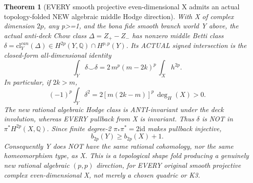 \documentclass[11pt]{article}
\newcommand{\Q}{\mathbb Q}
\newcommand{\cl}{\mathrm{cl}}
\newtheorem{theorem}{Theorem}
\begin{document}
\begin{theorem}[EVERY smooth projective even-dimensional X admits an actual topology-folded NEW algebraic middle Hodge direction]
With X of complex dimension \(2p\), any p>=1,
and the bona fide smooth branch world Y above,
the actual anti-deck Chow class
\(\Delta=Z_+-Z_-\) has nonzero middle Betti class
\(\delta=\cl_Y^{can}(\Delta)\in
 H^{2p}(Y,\Q)\cap H^{p,p}(Y)\).
Its ACTUAL signed intersection is the
closed-form all-dimensional identity
\[
 \boxed{
 \int_Y\delta\smile\delta
   =2\,m^p(m-2k)^p\,\int_Xh^{2p}.
 }                                                        \tag{7}
\]
In particular, if \(2k>m\),
\[
 \boxed{
 (-1)^p\int_Y\delta^2
   =2[m(2k-m)]^p\,\deg_H(X)>0.
 }                                                        \tag{8}
\]
The new rational algebraic Hodge class is
ANTI-invariant under the deck involution,
whereas EVERY pullback from X is invariant.
Thus \(\delta\) is NOT in \(\pi^*H^{2p}(X,\Q)\).
Since finite degree-2 \(\pi_*\pi^*=2\mathrm{id}\)
makes pullback injective,
\[
 \boxed{b_{2p}(Y)\ge b_{2p}(X)+1.}              \tag{9}
\]
Consequently Y does NOT have the same rational
cohomology, nor the same homeomorphism type, as X.
This is a topological shape fold producing a
genuinely new rational algebraic \((p,p)\) direction,
for EVERY original smooth projective complex
even-dimensional X, not merely a chosen quadric or K3.
\end{theorem}
\end{document}
